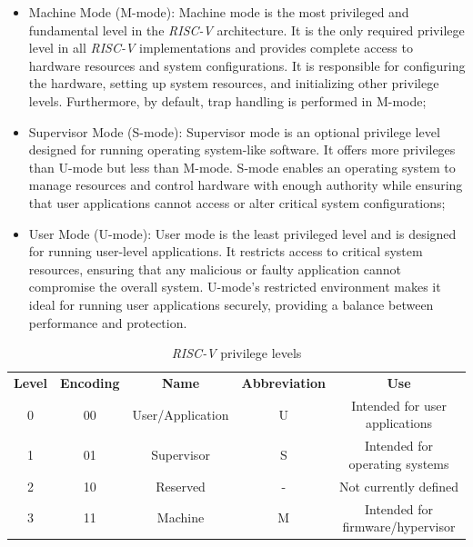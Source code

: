 \begin{itemize}
  \item Machine Mode (M-mode): Machine mode is the most privileged and
    fundamental level in the \textit{RISC-V} architecture. It is the only
    required privilege level in all \textit{RISC-V} implementations and provides
    complete access to hardware resources and system configurations. It is
    responsible for configuring the hardware, setting up system resources, and
    initializing other privilege levels. Furthermore, by default, trap handling is
    performed in M-mode;

  \item Supervisor Mode (S-mode): Supervisor mode is an optional privilege level
    designed for running operating system-like software. It offers more privileges
    than U-mode but less than M-mode. S-mode enables an operating system to
    manage resources and control hardware with enough authority while ensuring
    that user applications cannot access or alter critical system configurations;

  \item User Mode (U-mode): User mode is the least privileged level and is
    designed for running user-level applications. It restricts access to critical
    system resources, ensuring that any malicious or faulty application cannot
    compromise the overall system. U-mode's restricted environment makes it ideal
    for running user applications securely, providing a balance between
    performance and protection.
\end{itemize}

\begin{table}
  \centering
  \begin{tabular}{|c|c|c|c|c|}
    \hline
    \textbf{Level}   & \textbf{Encoding} & \textbf{Name}    & \textbf{Abbreviation} & \textbf{Use}                     \\
    \hhline{=====} 0 & 00                & User/Application & U                     & Intended for user applications   \\
    \hline
    1                & 01                & Supervisor       & S                     & Intended for operating systems   \\
    \hline
    2                & 10                & Reserved         & -                     & Not currently defined            \\
    \hline
    3                & 11                & Machine          & M                     & Intended for firmware/hypervisor \\
    \hline
  \end{tabular}
  \caption{\textit{RISC-V} privilege levels}
  \label{tab:priv}
\end{table}

